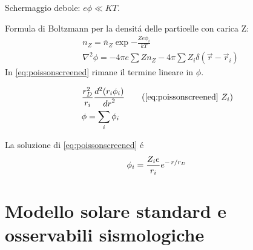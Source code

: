 \begin{block}{Schermaggio debole: $e\phi\ll KT$.}




Formula di Boltzmann per la densit\'a delle particelle con carica Z:
\begin{align}
&n_Z=\overline{n}_Z\exp{-\frac{Ze\phi_i}{kT}}\\
&\nabla^2\phi=-4\pi e\sum Zn_Z-4\pi\sum Z_i\delta(\vec{r}-\vec{r}_i)\label{eq:poissonscreened}
\end{align}
In \eqref{eq:poissonscreened} rimane il termine lineare in $\phi$.





\begin{align}
&\frac{r_D^2}{r_i}\TtwoDy{r}{(r_i\phi_i)}\tag{\ref{eq:poissonscreened} $Z_i$}\\
&\phi=\sum_i\phi_i
\end{align}

La soluzione di \eqref{eq:poissonscreened} \'e
\begin{equation}\label{eq:screenedpotential}
\phi_i=\frac{Z_ie}{r_i}e^{-\left.{r}\middle/{r_D}\right.}
\end{equation}


\end{block}

\section{Modello solare standard e osservabili sismologiche}


